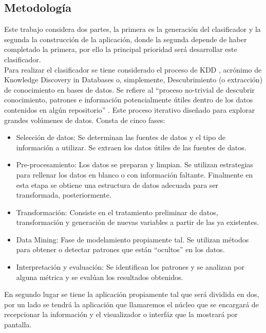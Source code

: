 \subsection{Metodología}
Este trabajo considera dos partes, la primera es la generación del clasificador y la segunda la construcción de la aplicación, donde la segunda depende de haber completado la primera, por ello la principal prioridad será desarrollar este clasificador.\\

Para realizar el clasificador se tiene considerado el proceso de KDD \cite{KDDFayyad}, acrónimo de Knowledge Discovery in Databases o, simplemente, Descubrimiento (o extracción) de conocimiento en bases de datos. Se refiere al “proceso no-trivial de descubrir conocimiento, patrones e información potencialmente útiles dentro de los datos contenidos en algún repositorio” \cite{KDDDefinicion}. Este proceso iterativo diseñado para explorar grandes volúmenes de datos. Consta de cinco fases:\\

\begin{itemize}
\item	Selección de datos: Se determinan las fuentes de datos y el tipo de información a utilizar. Se extraen los datos útiles de las fuentes de datos.
\item	Pre-procesamiento: Los datos se preparan y limpian. Se utilizan estrategias para rellenar los datos en blanco o con información faltante. Finalmente en esta etapa se obtiene una estructura de datos adecuada para ser transformada, posteriormente.
\item	Transformación: Consiste en el tratamiento preliminar de datos, transformación y generación de nuevas variables a partir de las ya existentes. 
\item	Data Mining: Fase de modelamiento propiamente tal. Se utilizan métodos para obtener o detectar patrones que están “ocultos” en los datos.
\item	Interpretación y evaluación: Se identifican los patrones y se analizan por alguna métrica y se evalúan los resultados obtenidos.
\end{itemize}

En segundo lugar se tiene la aplicación propiamente tal que será dividida en dos, por un lado se tendrá la aplicación que llamaremos el núcleo que se encargará de recepcionar la información y el visualizador o interfáz que la mostrará por pantalla.\\

